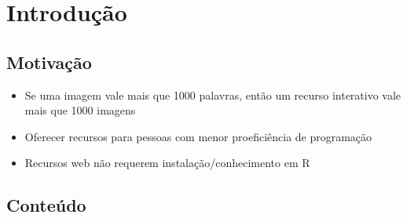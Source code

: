 \section{Introdução}

\subsection{Motivação}

\begin{frame}

  \begin{itemize}
  \item Se uma imagem vale mais que 1000 palavras, então um recurso
    interativo vale mais que 1000 imagens
  \item Oferecer recursos para pessoas com menor proeficiência de
    programação
  \item Recursos web não requerem instalação/conhecimento em R
  \end{itemize}

\end{frame}

\subsection{Conteúdo}

